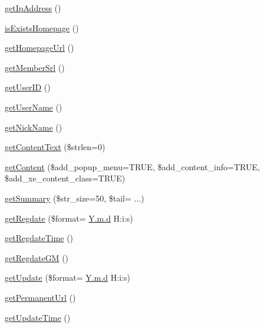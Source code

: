\begin{DoxyCompactItemize}
\item 
\hyperlink{classcommentItem_a487957e1ef240fd2ff03f122f7827347}{get\+Ip\+Address} ()
\item 
\hyperlink{classcommentItem_a77da9a1df41b15e776ef22ca2d648aa1}{is\+Exists\+Homepage} ()
\item 
\hyperlink{classcommentItem_ad10d90cb7e49989d7a43956886d8e2e8}{get\+Homepage\+Url} ()
\item 
\hyperlink{classcommentItem_a6cf2c8baefdc9183f0194805bc197231}{get\+Member\+Srl} ()
\item 
\hyperlink{classcommentItem_a5c793e6542e731da5d465c35c77b42fd}{get\+User\+ID} ()
\item 
\hyperlink{classcommentItem_a1c35032d37e80ad5018a02787f0091fe}{get\+User\+Name} ()
\item 
\hyperlink{classcommentItem_a097673677cd1c461040cbc9275b7fca9}{get\+Nick\+Name} ()
\item 
\hyperlink{classcommentItem_a5bd758e385068bff00ffc35a0737ff72}{get\+Content\+Text} (\$strlen=0)
\item 
\hyperlink{classcommentItem_afae7151c28cc9066f9c40a010597b25a}{get\+Content} (\$add\+\_\+popup\+\_\+menu=T\+R\+UE, \$add\+\_\+content\+\_\+info=T\+R\+UE, \$add\+\_\+xe\+\_\+content\+\_\+class=T\+R\+UE)
\item 
\hyperlink{classcommentItem_aabe11142b19d831c5e3120e48bb169f7}{get\+Summary} (\$str\+\_\+size=50, \$tail= \textquotesingle{}...\textquotesingle{})
\item 
\hyperlink{classcommentItem_acae004be4282c96181e79cc0f3b3adfa}{get\+Regdate} (\$format= \textquotesingle{}\hyperlink{xpresseditor_8min_8js_aa27188e30a5d2270a230edf44af69623}{Y.\+m.\+d} H\+:i\+:s\textquotesingle{})
\item 
\hyperlink{classcommentItem_adb5754f10a245c54a0beb4f6fb22f0e3}{get\+Regdate\+Time} ()
\item 
\hyperlink{classcommentItem_ae5f0203691b6d16a2d99ae40d67adb3f}{get\+Regdate\+GM} ()
\item 
\hyperlink{classcommentItem_aa7a413ef04f4c64c779a8bb119a5c214}{get\+Update} (\$format= \textquotesingle{}\hyperlink{xpresseditor_8min_8js_aa27188e30a5d2270a230edf44af69623}{Y.\+m.\+d} H\+:i\+:s\textquotesingle{})
\item 
\hyperlink{classcommentItem_adc6e6a36fd7c02a2f0fecc8a22f9b13b}{get\+Permanent\+Url} ()
\item 
\hyperlink{classcommentItem_a59d0264c1b6842c6a0dfa21a6dfe1edb}{get\+Update\+Time} ()
\item 

\end{DoxyCompactItemize}
